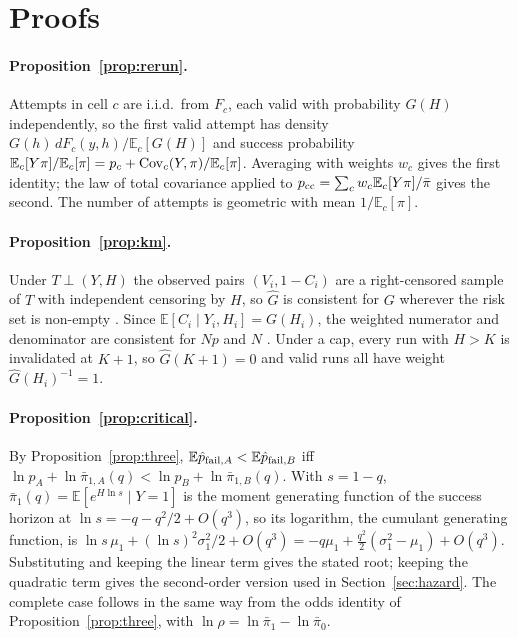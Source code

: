 \documentclass[11pt]{article}
\theoremstyle{definition}
\theoremstyle{remark}
\newcommand{\pb}{\bar\pi}
\newcommand{\E}{\mathbb{E}}
\begin{document}



\appendix

\section{Proofs}
\label{app:proofs}

\paragraph{Proposition~\ref{prop:rerun}.} Attempts in cell $c$ are i.i.d.\ from
$F_c$, each valid with probability $G(H)$ independently, so the first valid
attempt has density $G(h)\,dF_c(y,h)/\E_c[G(H)]$ and success probability
$\E_c[Y\pi]/\E_c[\pi]=p_c+{\rm Cov}_c(Y,\pi)/\E_c[\pi]$. Averaging with weights
$w_c$ gives the first identity; the law of total covariance applied to
$p_{\rm cc}=\sum_cw_c\E_c[Y\pi]/\pb$ gives the second. The number of attempts is
geometric with mean $1/\E_c[\pi]$.

\paragraph{Proposition~\ref{prop:km}.} Under $T\perp(Y,H)$ the observed pairs
$(V_i,1-C_i)$ are a right-censored sample of $T$ with independent censoring by
$H$, so $\hat G$ is consistent for $G$ wherever the risk set is non-empty
\citep{kaplan1958nonparametric}. Since $\E[C_i\mid Y_i,H_i]=G(H_i)$, the
weighted numerator and denominator are consistent for $Np$ and $N$
\citep{satten2001kaplan}. Under a cap, every run with $H>K$ is invalidated at
$K+1$, so $\hat G(K+1)=0$ and valid runs all have weight $\hat G(H_i)^{-1}=1$.

\paragraph{Proposition~\ref{prop:critical}.} By Proposition~\ref{prop:three},
$\E\hat p_{{\rm fail},A}<\E\hat p_{{\rm fail},B}$ iff
$\ln p_A+\ln\pb_{1,A}(q)<\ln p_B+\ln\pb_{1,B}(q)$. With $s=1-q$,
$\pb_1(q)=\E[e^{H\ln s}\mid Y=1]$ is the moment generating function of the
success horizon at $\ln s=-q-q^2/2+O(q^3)$, so its logarithm, the cumulant
generating function, is $\ln s\,\mu_1+(\ln s)^2\sigma_1^2/2+O(q^3)
=-q\mu_1+\tfrac{q^2}{2}(\sigma_1^2-\mu_1)+O(q^3)$. Substituting and keeping the
linear term gives the stated root; keeping the quadratic term gives the
second-order version used in Section~\ref{sec:hazard}. The complete case follows
in the same way from the odds identity of Proposition~\ref{prop:three}, with
$\ln\rho=\ln\pb_1-\ln\pb_0$.
\end{document}
